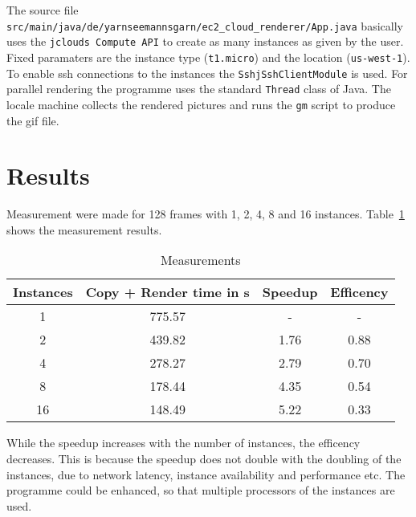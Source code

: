 \documentclass{article}
\begin{document}
The source file \texttt{src/\-main/\-java/\-de/\-yarnseemannsgarn/\-ec2\_cloud\_renderer/\-App.java} basically uses the \texttt{jclouds Compute API} to create as many instances as given by the user. Fixed paramaters are the instance type (\texttt{t1.micro}) and the location (\texttt{us-west-1}). To enable ssh connections to the instances the \texttt{Sshj\-Ssh\-Client\-Module} is used. For parallel rendering the programme uses the standard \texttt{Thread} class of Java. The locale machine collects the rendered pictures and runs the \texttt{gm} script to produce the gif file.


\section{Results}

Measurement were made for 128 frames with 1, 2, 4, 8 and 16 instances. Table~\ref{tab:measurements} shows the measurement results.

\begin{table}[htbp]
\centering
\begin{tabular}{ | c | c | c | c | }
\hline
\textbf{Instances} & \textbf{Copy + Render time} in s & \textbf{Speedup} & \textbf{Efficency} \\
\hline \hline
1 & 775.57 & - & - \\
\hline
2 & 439.82 & 1.76 & 0.88 \\
\hline
4 & 278.27 & 2.79 & 0.70 \\
\hline
8 & 178.44 & 4.35 & 0.54 \\
\hline
16 & 148.49 & 5.22 & 0.33 \\
\hline
\end{tabular}
\caption{Measurements}
\label{tab:measurements}
\end{table}

While the speedup increases with the number of instances, the efficency decreases. This is because the speedup does not double with the doubling of the instances, due to network latency, instance availability and performance etc. The programme could be enhanced, so that multiple processors of the instances are used.
\end{document}

